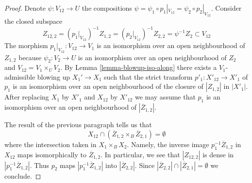 \documentclass[10pt,a4paper]{amsart}
\theoremstyle{plain}
\theoremstyle{definition}
\theoremstyle{remark}
\numberwithin{equation}{subsection}
\begin{document}
\begin{proof}
\medskip\noindent
Denote $\psi : V_{12} \to U$ the compositions
$\psi = \psi_1 \circ p_1|_{V_{12}} = \psi_2 \circ p_2|_{V_{12}}$.
Consider the closed subspace
$$
Z_{12, 2} =
(p_1|_{V_{12}})^{-1}Z_{1, 2} =
(p_2|_{V_{12}})^{-1}Z_{2, 2} =
\psi^{-1}Z_2 \subset V_{12}
$$
The morphism $p_1|_{V_{12}} : V_{12} \to V_1$ is an isomorphism
over an open neighbourhood of $Z_{1, 2}$ because $\psi_2 : V_2 \to U$
is an isomorphism over an open neighbourhood of $Z_2$ and
$V_{12} = V_1 \times_U V_2$. By Lemma \ref{lemma-blowup-iso-along}
there exists a $V_1$-admissible blowing up $X_1' \to X_1$
such that the strict transform $p'_1 : X'_{12} \to X'_1$
of $p_1$ is an isomorphism over an open neighbourhood of
the closure of $|Z_{1, 2}|$ in $|X'_1|$.
After replacing $X_1$ by $X'_1$ and $X_{12}$ by $X'_{12}$
we may assume that $p_1$ is an isomorphism over an open
neighbourhood of $|\overline{Z}_{1, 2}|$.

\medskip\noindent
The result of the previous paragraph tells us that
$$
X_{12} \cap (\overline{Z}_{1, 2} \times_B \overline{Z}_{2, 1}) = \emptyset
$$
where the intersection taken in $X_1 \times_B X_2$. Namely, the inverse
image $p_1^{-1}\overline{Z}_{1, 2}$ in $X_{12}$ maps isomorphically
to $\overline{Z}_{1, 2}$. In particular, we see that $|Z_{12, 2}|$
is dense in $|p_1^{-1}\overline{Z}_{1, 2}|$. Thus $p_2$ maps
$|p_1^{-1}\overline{Z}_{1, 2}|$ into $|\overline{Z}_{2, 2}|$.
Since $|\overline{Z}_{2, 2}| \cap |\overline{Z}_{2, 1}| = \emptyset$
we conclude.


\end{proof}
\end{document}
